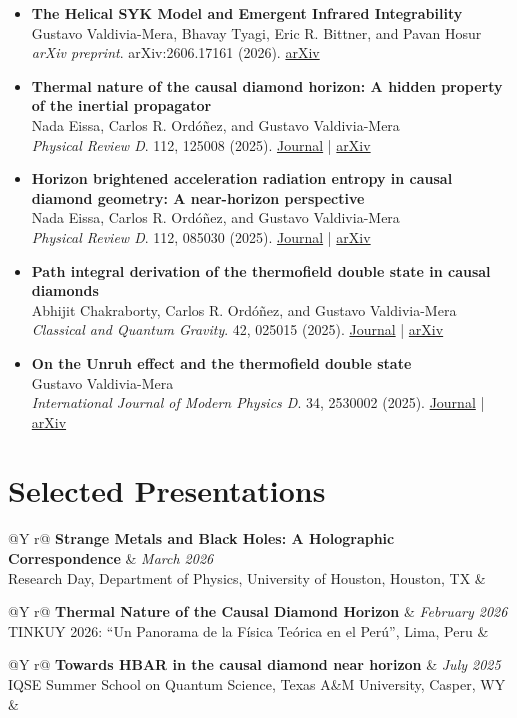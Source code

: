 \documentclass[10pt,a4paper]{article}
\makeatletter
\newcommand{\talk}[3]{%
  \begin{tabularx}{\textwidth}{@{}Y r@{}}
    \textbf{#1} & \textit{#2} \\
    #3 &
  \end{tabularx}
}
\newcommand{\publication}[5]{%
  \item \textbf{#1}\\
  #2\\
  \textit{#3}. #4. #5
}
\makeatother
\begin{document}
\begin{itemize}
  \publication
  {The Helical SYK Model and Emergent Infrared Integrability}
  {Gustavo Valdivia-Mera, Bhavay Tyagi, Eric R. Bittner, and Pavan Hosur}
  {arXiv preprint}
  {arXiv:2606.17161 (2026)}
  {\href{https://arxiv.org/abs/2606.17161}{arXiv}}

  \publication
  {Thermal nature of the causal diamond horizon: A hidden property of the inertial propagator}
  {Nada Eissa, Carlos R. Ordóñez, and Gustavo Valdivia-Mera}
  {Physical Review D}
  {112, 125008 (2025)}
  {\href{https://journals.aps.org/prd/abstract/10.1103/PhysRevD.112.125008}{Journal} \;|\; \href{https://arxiv.org/abs/2508.16880}{arXiv}}

  \publication
  {Horizon brightened acceleration radiation entropy in causal diamond geometry: A near-horizon perspective}
  {Nada Eissa, Carlos R. Ordóñez, and Gustavo Valdivia-Mera}
  {Physical Review D}
  {112, 085030 (2025)}
  {\href{https://journals.aps.org/prd/abstract/10.1103/PhysRevD.112.085030}{Journal} \;|\; \href{https://arxiv.org/abs/2508.13493}{arXiv}}

  \publication
  {Path integral derivation of the thermofield double state in causal diamonds}
  {Abhijit Chakraborty, Carlos R. Ordóñez, and Gustavo Valdivia-Mera}
  {Classical and Quantum Gravity}
  {42, 025015 (2025)}
  {\href{https://iopscience.iop.org/article/10.1088/1361-6382/ad9e65}{Journal} \;|\; \href{https://arxiv.org/abs/2312.03541}{arXiv}}

  \publication
  {On the Unruh effect and the thermofield double state}
  {Gustavo Valdivia-Mera}
  {International Journal of Modern Physics D}
  {34, 2530002 (2025)}
  {\href{https://www.worldscientific.com/doi/10.1142/S0218271825300022}{Journal} \;|\; \href{https://arxiv.org/abs/2001.09869}{arXiv}}
\end{itemize}

\newpage
\section{Selected Presentations}

\talk{Strange Metals and Black Holes: A Holographic Correspondence}{March 2026}
{Research Day, Department of Physics, University of Houston, Houston, TX}

\talk{Thermal Nature of the Causal Diamond Horizon}{February 2026}
{TINKUY 2026: ``Un Panorama de la Física Teórica en el Perú'', Lima, Peru}

\talk{Towards HBAR in the causal diamond near horizon}{July 2025}
{IQSE Summer School on Quantum Science, Texas A\&M University, Casper, WY}
\end{document}
